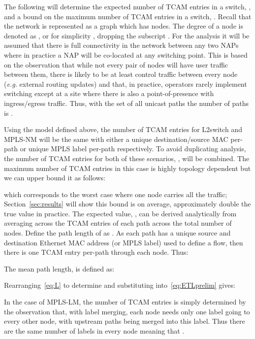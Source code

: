 \documentclass[conference]{IEEEtran}
\begin{document}
The following will determine the expected number of TCAM entries in a switch, , and a bound on the maximum number of TCAM entries in a switch, . Recall that the network is represented as a graph  which has  nodes. The degree of a node  is denoted as , or for simplicity , dropping the subscript . For the analysis it will be assumed that there is full connectivity in the network between any two NAPs where in practice a NAP will be co-located at any switching point. This is based on the observation that while not every pair of nodes will have user traffic between them, there is likely to be at least control traffic between every node (\emph{e.g.} external routing updates) and that, in practice, operators rarely implement switching except at a site where there is also a point-of-presence with ingress/egress traffic. Thus, with the set of all unicast paths  the number of paths is .

Using the model defined above, the number of TCAM entries for L2switch and MPLS-NM will be the same with either a unique destination/source MAC per-path or unique MPLS label per-path respectively. To avoid duplicating analysis, the number of TCAM entries for both of these scenarios, , will be combined.  The maximum number of TCAM entries in this case is highly topology dependent but we can upper bound it as follows: 

which corresponds to the worst case where one node carries all the traffic;  Section~\ref{sec:results} will show this bound is on average, approximately double the true value in practice.  The expected value, , can be derived analytically from averaging across the TCAM entries of each path across the total number of nodes. Define the path length of  as . As each path has a unique source and destination Ethernet MAC address (or MPLS label) used to define a flow, then there is one TCAM entry per-path through each node. Thus:

The mean path length,  is defined as:

Rearranging~\eqref{eq:L} to determine  and substituting
into~\eqref{eq:ETLprelim} gives:


In the case of MPLS-LM, the number of TCAM entries  is simply determined by the observation that, with label merging, each node needs only one label going to every other node, with upstream paths being merged into this label. Thus there are the same number of labels in every node meaning that .
\end{document}
